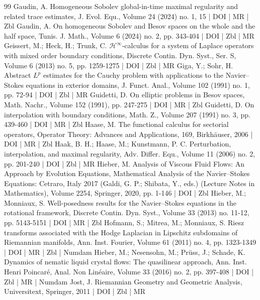 \documentclass[10pt]{amsart}
\theoremstyle{definition}\newtheorem{defi}[theo]{Definition}\newtheorem{rema}[theo]{Remark}\newtheorem{exam}[theo]{Example}\newtheorem{exem}[theo]{Example}\newtheorem{nota}[theo]{Notation}
\begin{document}
\begin{thebibliography}{99}
 Gaudin, A. Homogeneous Sobolev global-in-time maximal regularity and related trace estimates, J. Evol. Equ., Volume 24 (2024) no. 1, 15 | DOI | MR | Zbl
 Gaudin, A. On homogeneous Sobolev and Besov spaces on the whole and the half space, Tunis. J. Math., Volume 6 (2024) no. 2, pp. 343-404 | DOI | Zbl | MR
 Geissert, M.; Heck, H.; Trunk, C. ${\mathcal{H}}^\infty $-calculus for a system of Laplace operators with mixed order boundary conditions, Discrete Contin. Dyn. Syst., Ser. S, Volume 6 (2013) no. 5, pp. 1259-1275 | DOI | Zbl | MR
 Giga, Y.; Sohr, H. Abstract ${L}^p$ estimates for the Cauchy problem with applications to the Navier–Stokes equations in exterior domains, J. Funct. Anal., Volume 102 (1991) no. 1, pp. 72-94 | DOI | Zbl | MR
 Guidetti, D. On elliptic problems in Besov spaces, Math. Nachr., Volume 152 (1991), pp. 247-275 | DOI | MR | Zbl
 Guidetti, D. On interpolation with boundary conditions, Math. Z., Volume 207 (1991) no. 3, pp. 439-460 | DOI | MR | Zbl
 Haase, M. The functional calculus for sectorial operators, Operator Theory: Advances and Applications, 169, Birkhäuser, 2006 | DOI | MR | Zbl
 Haak, B. H.; Haase, M.; Kunstmann, P. C. Perturbation, interpolation, and maximal regularity, Adv. Differ. Equ., Volume 11 (2006) no. 2, pp. 201-240 | DOI | Zbl | MR
 Hieber, M. Analysis of Viscous Fluid Flows: An Approach by Evolution Equations, Mathematical Analysis of the Navier–Stokes Equations: Cetraro, Italy 2017 (Galdi, G. P.; Shibata, Y., eds.) (Lecture Notes in Mathematics), Volume 2254, Springer, 2020, pp. 1-146 | DOI | Zbl
 Hieber, M.; Monniaux, S. Well-posedness results for the Navier–Stokes equations in the rotational framework, Discrete Contin. Dyn. Syst., Volume 33 (2013) no. 11-12, pp. 5143-5151 | DOI | MR | Zbl
 Hofmann, S.; Mitrea, M.; Monniaux, S. Riesz transforms associated with the Hodge Laplacian in Lipschitz subdomains of Riemannian manifolds, Ann. Inst. Fourier, Volume 61 (2011) no. 4, pp. 1323-1349 | DOI | MR | Zbl | Numdam
 Hieber, M.; Nesensohn, M.; Prüss, J.; Schade, K. Dynamics of nematic liquid crystal flows: The quasilinear approach, Ann. Inst. Henri Poincaré, Anal. Non Linéaire, Volume 33 (2016) no. 2, pp. 397-408 | DOI | Zbl | MR | Numdam
 Jost, J. Riemannian Geometry and Geometric Analysis, Universitext, Springer, 2011 | DOI | Zbl | MR

\end{thebibliography}
\end{document}
